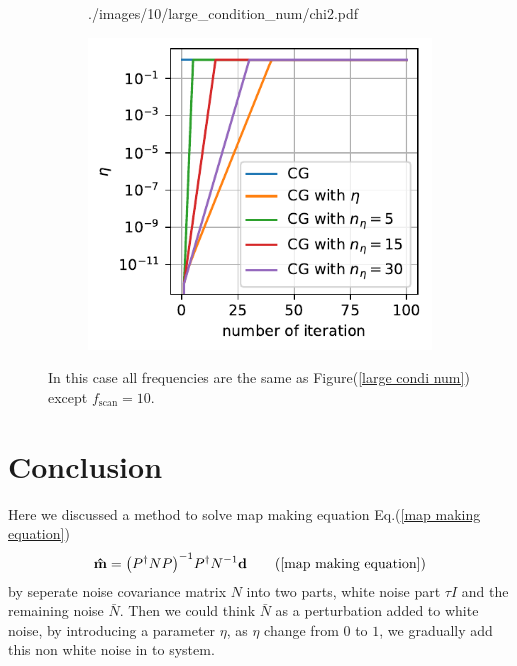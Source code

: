 \documentclass[11pt, letterpaper]{article}
\newcommand{\vbd}{\vb{d}}
\newcommand{\inv}[1]{#1^{-1}}
\newcommand{\hatm}{\vb{\hat{m}}}
\newcommand{\Pdagger}{P^{\dagger}}
\newcommand{\Nbar}{\bar{N}}
\newcommand{\PPinv}[1]{\inv{\qty(\Pdagger #1 P)}}
\begin{document}
\begin{figure}[htb]
\begin{subfigure}{0.33\textwidth}
        {./images/10/large_condition_num/chi2.pdf}
    \caption{}
    \label{large condi num chi2 10}
\end{subfigure}%
\begin{subfigure}{0.33\textwidth}
    \centering
    \includegraphics[width=\linewidth]
        {./images/10/large_condition_num/eta.pdf}
    \caption{}
    \label{large condi num eta 10}
\end{subfigure}
\caption{In this case all frequencies are the same as
    Figure(\ref{large condi num}) except $f_{\text{scan}} = 10$.
}
\label{large condi num 10}
\end{figure}



\section{Conclusion}
Here we discussed a method to solve map making equation
Eq.(\ref{map making equation})
\begin{align}
\hatm = \PPinv{N} \Pdagger \inv{N} \vbd \tag{\ref{map making equation}}
\end{align}
by seperate noise covariance matrix $N$ into two parts, white noise part
$\tau I$ and the remaining noise $\Nbar$.
Then we could think $\Nbar$ as a perturbation added to white noise, 
by introducing a parameter $\eta$, as $\eta$ change from $0$ to $1$,
we gradually add this non white noise in to system.
\end{document}
